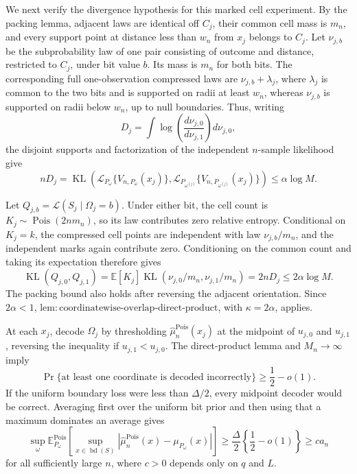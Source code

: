 We next verify the divergence hypothesis for this marked cell experiment.  By the packing lemma, adjacent laws are identical off \(C_j\), their common cell mass is \(m_n\), and every support point at distance less than \(w_n\) from \(x_j\) belongs to \(C_j\).  Let \(\nu_{j,b}\) be the subprobability law of one pair consisting of outcome and distance, restricted to \(C_j\), under bit value \(b\).  Its mass is \(m_n\) for both bits.  The corresponding full one-observation compressed laws are \(\nu_{j,b}+\lambda_j\), where \(\lambda_j\) is common to the two bits and is supported on radii at least \(w_n\), whereas \(\nu_{j,b}\) is supported on radii below \(w_n\), up to null boundaries.  Thus, writing
\[
 D_j=\int\log\!\left(\frac{d\nu_{j,0}}{d\nu_{j,1}}\right)d\nu_{j,0},
\]
the disjoint supports and factorization of the independent \(n\)-sample likelihood give
\[
 nD_j
 =\operatorname{KL}\!\left(
 \mathcal L_{P_\omega}\{V_{n,P_\omega}(x_j)\},
 \mathcal L_{P_{\omega^{(j)}}}\{V_{n,P_{\omega^{(j)}}}(x_j)\}
 \right)
 \leq\alpha\log M.
\]

Let \(Q_{j,b}=\mathcal L(S_j\mid\Omega_j=b)\).  Under either bit, the cell count is \(K_j\sim\operatorname{Pois}(2nm_n)\), so its law contributes zero relative entropy.  Conditional on \(K_j=k\), the compressed cell points are independent with law \(\nu_{j,b}/m_n\), and the independent marks again contribute zero.  Conditioning on the common count and taking its expectation therefore gives
\[
 \operatorname{KL}(Q_{j,0},Q_{j,1})
 =\mathbb E[K_j]\operatorname{KL}(\nu_{j,0}/m_n,\nu_{j,1}/m_n)
 =2nD_j
 \leq2\alpha\log M.
\]
The packing bound also holds after reversing the adjacent orientation.  Since \(2\alpha<1\), \(\mathrm{lem:coordinatewise\text{-}overlap\text{-}direct\text{-}product}\), with \(\kappa=2\alpha\), applies.

At each \(x_j\), decode \(\Omega_j\) by thresholding \(\widehat\mu_n^{\mathrm{Pois}}(x_j)\) at the midpoint of \(u_{j,0}\) and \(u_{j,1}\), reversing the inequality if \(u_{j,1}<u_{j,0}\).  The direct-product lemma and \(M_n\to\infty\) imply
\[
 \Pr\{\text{at least one coordinate is decoded incorrectly}\}
 \geq\frac12-o(1).
\]
If the uniform boundary loss were less than \(\Delta/2\), every midpoint decoder would be correct.  Averaging first over the uniform bit prior and then using that a maximum dominates an average gives
\[
 \sup_\omega
 \mathbb E_{P_\omega}^{\mathrm{Pois}}\!\left[
 \sup_{x\in\operatorname{bd}(S)}
 |\widehat\mu_n^{\mathrm{Pois}}(x)-\mu_{P_\omega}(x)|
 \right]
 \geq\frac{\Delta}{2}\left\{\frac12-o(1)\right\}
 \geq c a_n
\]
for all sufficiently large \(n\), where \(c>0\) depends only on \(q\) and \(L\).

